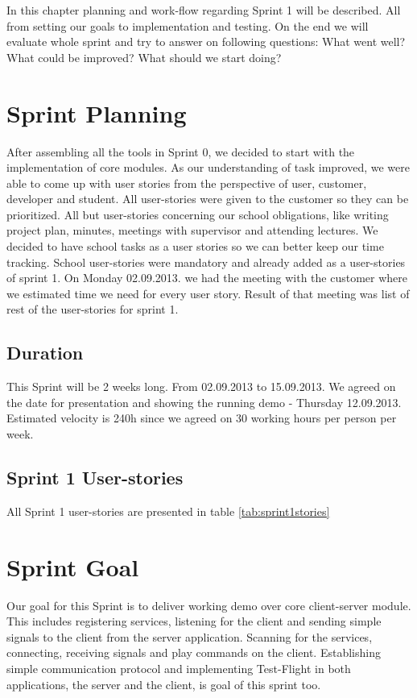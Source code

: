 In this chapter planning and work-flow regarding Sprint 1 will be described. 
All from setting our goals to implementation and testing. On the end we will evaluate whole sprint and try to answer on following questions: What went well? What could be improved? What should we start doing?  

\section{Sprint Planning}
After assembling all the tools in Sprint 0, we decided to start with the implementation of core modules.
As our understanding of task improved, we were able to come up with user stories from the perspective of user, customer, developer and student.
All user-stories were given to the customer so they can be prioritized. 
All but user-stories concerning our school obligations, like writing project plan, minutes, meetings with supervisor and attending lectures.
We decided to have school tasks as a user stories so we can better keep our time tracking. 
School user-stories were mandatory and already added as a user-stories of sprint 1.
On Monday 02.09.2013. we had the meeting with the customer where we estimated time we need for every user story.
Result of that meeting was list of rest of the user-stories for sprint 1.

\subsection{Duration}
This Sprint will be 2 weeks long. From 02.09.2013 to 15.09.2013.
We agreed on the date for presentation and showing the running demo - Thursday 12.09.2013.
Estimated velocity is 240h since we agreed on 30 working hours per person per week.

\subsection{Sprint 1 User-stories}

All Sprint 1 user-stories are presented in table \ref{tab:sprint1stories}


\section{Sprint Goal}

Our goal for this Sprint is to deliver working demo over core client-server module.
This includes registering services, listening for the client and sending simple signals to the client from the server application.
Scanning for the services, connecting, receiving signals and play commands on the client.
Establishing simple communication protocol and implementing Test-Flight in both applications, the server and the client, is goal of this sprint too.

